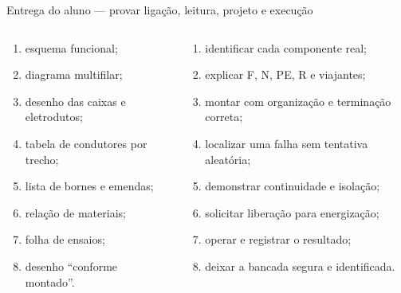 \begin{frame}{Entrega do aluno — provar ligação, leitura, projeto e execução}
\small
\begin{columns}[T,onlytextwidth]
\begin{caixaProjeto}[title=Documentos]
\begin{enumerate}
\item esquema funcional;
\item diagrama multifilar;
\item desenho das caixas e eletrodutos;
\item tabela de condutores por trecho;
\item lista de bornes e emendas;
\item relação de materiais;
\item folha de ensaios;
\item desenho ``conforme montado''.
\end{enumerate}
\end{caixaProjeto}
\begin{caixaNorma}[title=Demonstração prática]
\begin{enumerate}
\item identificar cada componente real;
\item explicar F, N, PE, R e viajantes;
\item montar com organização e terminação correta;
\item localizar uma falha sem tentativa aleatória;
\item demonstrar continuidade e isolação;
\item solicitar liberação para energização;
\item operar e registrar o resultado;
\item deixar a bancada segura e identificada.
\end{enumerate}
\end{caixaNorma}
\end{columns}
\end{frame}
